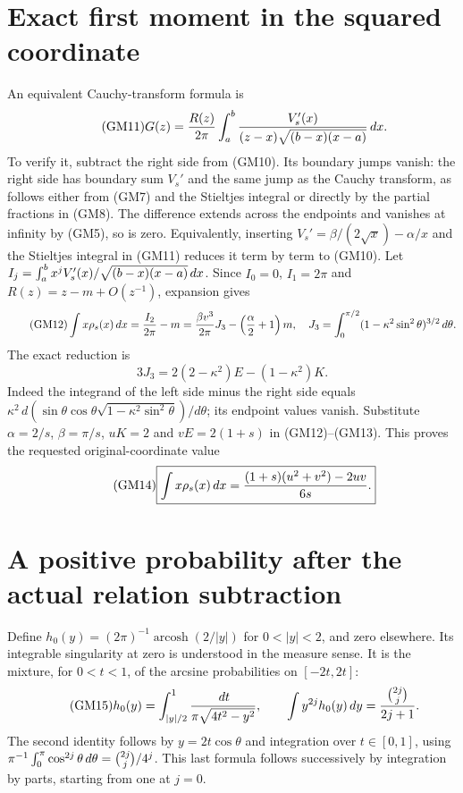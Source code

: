 \documentclass[11pt]{article}
\begin{document}
\section{Exact first moment in the squared coordinate}
An equivalent Cauchy-transform formula is
\begin{equation}\tag{GM11}
 G(z)=\frac{R(z)}{2\pi}
 \int_a^b\frac{V_s'(x)}{(z-x)\sqrt{(b-x)(x-a)}}\,d x.
\end{equation}
To verify it, subtract the right side from (GM10). Its boundary jumps
vanish: the right side has boundary sum $V_s'$ and the same jump as
the Cauchy transform, as follows either from (GM7) and the Stieltjes
integral or directly by the partial fractions in (GM8).
The difference extends across the endpoints and vanishes at infinity
by (GM5), so is zero. Equivalently, inserting
$V_s'=\beta/(2\sqrt x)-\alpha/x$ and the Stieltjes integral in (GM11)
reduces it term by term to (GM10).
Let $I_j=\int_a^b x^jV_s'(x)/\sqrt{(b-x)(x-a)}\,d x$.
Since $I_0=0$, $I_1=2\pi$ and $R(z)=z-m+O(z^{-1})$, expansion gives
\begin{equation}\tag{GM12}
 \int x\rho_s(x)\,d x=\frac{I_2}{2\pi}-m
 =\frac{\beta v^3}{2\pi}J_3-\left(\frac\alpha2+1\right)m,
 \quad J_3=\int_0^{\pi/2}(1-\kappa^2\sin^2\theta)^{3/2}\,d\theta.
\end{equation}
The exact reduction is
\begin{equation}\tag{GM13}
 3J_3=2(2-\kappa^2)E-(1-\kappa^2)K.
\end{equation}
Indeed the integrand of the left side minus the right side equals
$\kappa^2\,d(\sin\theta\cos\theta
\sqrt{1-\kappa^2\sin^2\theta})/d\theta$; its endpoint values vanish.
Substitute $\alpha=2/s$, $\beta=\pi/s$, $uK=2$ and $vE=2(1+s)$
in (GM12)--(GM13). This proves the requested original-coordinate value
\begin{equation}\tag{GM14}
 \boxed{\displaystyle\int x\rho_s(x)\,d x
 =\frac{(1+s)(u^2+v^2)-2uv}{6s}.}
\end{equation}

\section{A positive probability after the actual relation subtraction}
Define $h_0(y)=(2\pi)^{-1}\operatorname{arcosh}(2/|y|)$ for $0<|y|<2$,
and zero elsewhere. Its integrable singularity at zero is understood in
the measure sense. It is the mixture, for $0<t<1$, of the arcsine
probabilities on $[-2t,2t]$:
\begin{equation}\tag{GM15}
 h_0(y)=\int_{|y|/2}^1\frac{\,d t}{\pi\sqrt{4t^2-y^2}},\qquad
 \int y^{2j}h_0(y)\,d y=\frac{\binom{2j}j}{2j+1}.
\end{equation}
The second identity follows by $y=2t\cos\theta$ and integration over
$t\in[0,1]$, using
$\pi^{-1}\int_0^\pi\cos^{2j}\theta\,d\theta=\binom{2j}j/4^j$.
This last formula follows successively by integration by parts, starting
from one at $j=0$.
\end{document}
